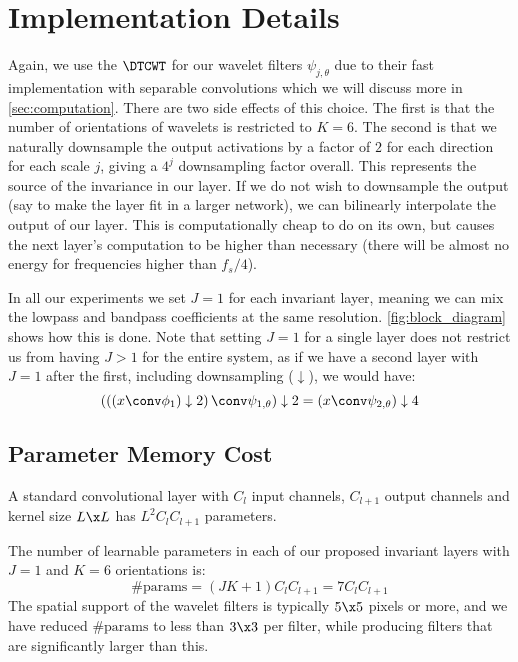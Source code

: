 \section{Implementation Details}\label{sec:implementation}
Again, we use the $\DTCWT$ \cite{selesnick_dual-tree_2005} for our wavelet filters
$\psi_{j, \theta}$ due to their fast implementation with separable convolutions
which we will discuss more in \autoref{sec:computation}.  There are two side
effects of this choice. The first is that the number of orientations of wavelets
is restricted to $K=6$. The second is that we naturally downsample the output
activations by a factor of $2$ for each direction for each scale $j$, giving a 
$4^j$ downsampling factor overall. This represents the
source of the invariance in our layer. If we do not wish to downsample the
output (say to make the layer fit in a larger network), we can bilinearly
interpolate the output of our layer. This is computationally cheap to do on its
own, but causes the next layer's computation to be higher than necessary (there
will be almost no energy for frequencies higher than $f_s/4$).

In all our experiments we set $J=1$ for each invariant layer,
meaning we can mix the lowpass and bandpass coefficients at the same resolution.
\autoref{fig:block_diagram} shows how this is done. Note that setting $J=1$ for
a single layer does not restrict us from having $J>1$ for the entire system, as
if we have a second layer with $J=1$ after the first, including downsampling
($\downarrow$), we would have:
%
\begin{equation}
  \left(\left(\left(x \conv \phi_1\right) \downarrow 2\right) \conv \psi_{1, \theta}\right) 
    \downarrow 2 = \left(x \conv \psi_{2, \theta}\right) \downarrow 4
\end{equation}

\subsection{Parameter Memory Cost}\label{sec:memory}
A standard convolutional layer with $C_l$ input channels, $C_{l+1}$ output channels
and kernel size $L\x L$ has $L^2C_{l}C_{l+1}$ parameters. 

The number of learnable parameters in each of our proposed invariant layers with
$J=1$ and $K=6$ orientations is:
%
\begin{equation}
  \text{\#params} = (JK+1)C_{l}C_{l+1} = 7C_{l}C_{l+1}
\end{equation} 
%
The spatial support of the wavelet filters is typically $5\x 5$ pixels or more,
and we have reduced $\text{\#params}$ to less than $3\x3$ per filter, while
producing filters that are significantly larger than this.

